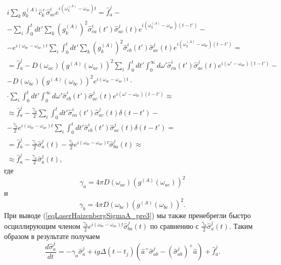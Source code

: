 \begin{eqnarray}
i
\sum_{k}
g_k^{(A)}
\hat{c}_k^{+}\hat{\sigma}^{i}_{ac}  
e^{i\left(\omega_k^{(A)} - \omega_{ac}\right)t} = \hat{f}_{a}^{j} -
\nonumber \\
-
\sum_i
\int_0^t d t'
\sum_k 
\left(g_{k}^{(A)}\right)^2
\hat{\sigma}_{ca}^{i}\left(t'\right)\hat{\sigma}^{j}_{ac}\left(t\right) 
e^{i\left(\omega_{k}^{(A)} - \omega_{ac}\right)\left(t-t'\right)}
-
\nonumber \\
-
e^{i\left(\omega_{bc} - \omega_{ac}\right)t}
\sum_i 
\int_0^t d t'
\sum_k
\left(g_{k}^{(A)}\right)^2
\hat{\sigma}_{cb}^{i}\left(t'\right)\hat{\sigma}^{j}_{ac}\left(t\right) 
e^{i\left(\omega_{k}^{(A)} - \omega_{bc}\right)\left(t-t'\right)}
 = 
\nonumber \\
=
\hat{f}_{a}^{j}
-
D\left(\omega_{ac}\right)
\left(g^{(A)}\left(\omega_{ac}\right)\right)^2
\sum_i
\int_0^t d t'
\int_0^{\infty}d \omega' 
\hat{\sigma}_{ca}^{i}\left(t'\right)\hat{\sigma}^{j}_{ac}\left(t\right) 
e^{i\left(\omega' - \omega_{ac}\right)\left(t-t'\right)}
-
\nonumber \\
-
D\left(\omega_{bc}\right)
\left(g^{(A)}\left(\omega_{bc}\right)\right)^2
e^{i\left(\omega_{bc} - \omega_{ac}\right)t} \cdot
\nonumber \\ 
\cdot
\sum_i 
\int_0^t d t'
\int_0^{\infty}d \omega' 
\hat{\sigma}_{cb}^{i}\left(t'\right)\hat{\sigma}^{j}_{ac}\left(t\right) 
e^{i\left(\omega' - \omega_{bc}\right)\left(t-t'\right)}
\approx
\nonumber \\
\approx
\hat{f}_{a}^{j}
- 
\frac{\gamma_{a}}{2}
\sum_i
\int_0^t d t'
\hat{\sigma}_{ca}^{i}\left(t'\right)\hat{\sigma}^{j}_{ac}\left(t\right) 
\delta\left(t-t'\right)
-
\nonumber \\
-
\frac{\gamma_{b}}{2}
e^{i\left(\omega_{bc} - \omega_{ac}\right)t}
\sum_i 
\int_0^t d t'
\hat{\sigma}_{cb}^{i}\left(t'\right)\hat{\sigma}^{j}_{ac}\left(t\right) 
\delta\left(t-t'\right) =
\nonumber \\
= \hat{f}_{a}^{j}
- 
\frac{\gamma_{a}}{2}
\hat{\sigma}_{a}^{j}\left(t\right) 
-
\frac{\gamma_{b}}{2}
e^{i\left(\omega_{bc} - \omega_{ac}\right)t}
\hat{\sigma}_{ba}^{j}\left(t\right) \approx
\nonumber \\
\approx
\hat{f}_{a}^{j}
- 
\frac{\gamma_{a}}{2}
\hat{\sigma}_{a}^{j}\left(t\right),
\label{eqLaserHaizenbergSigmaA_pre3}
\end{eqnarray}
где 
\[
\gamma_{a} = 4 \pi D\left(\omega_{ac}\right)
\left(g^{(A)}\left(\omega_{ac}\right)\right)^2
\]
и
\[
\gamma_{b} = 4 \pi D\left(\omega_{bc}\right)
\left(g^{(A)}\left(\omega_{bc}\right)\right)^2.
\]
При выводе (\ref{eqLaserHaizenbergSigmaA_pre3}) мы также пренебрегли
быстро осциллирующим членом 
$\frac{\gamma_{b}}{2}
e^{i\left(\omega_{bc} - \omega_{ac}\right)t}
\hat{\sigma}_{ba}^{j}\left(t\right)$ 
по сравнению с 
$\frac{\gamma_{a}}{2}
\hat{\sigma}_{a}^{j}\left(t\right)$.
Таким образом в результате получаем
\begin{equation}
\frac{d \hat{\sigma}_a^j}{d t} = 
- \gamma_{a} \hat{\sigma}_{a}^{j} +
i g 
\Delta\left(t - t_j\right) 
 \left(
\hat{a}^{+}\hat{\sigma}^{j}_{ab} -
\left(\hat{\sigma}^{j}_{ab}\right)^{+}\hat{a}
\right) + \hat{f}_{a}^{j}.
\label{eqLaserHaizenbergSigmaAJ}
\end{equation}

